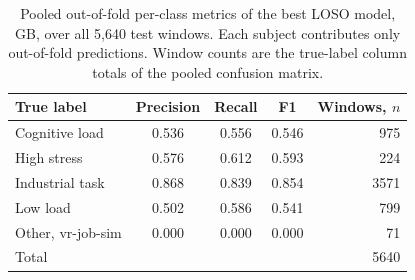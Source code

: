 \begin{table}[t]
\centering
\small
\caption{Pooled out-of-fold per-class metrics of the best LOSO model, GB, over all
5,640 test windows. Each subject contributes only out-of-fold predictions. Window
counts are the true-label column totals of the pooled confusion matrix.}
\label{tab:perclass}
\begin{tabular}{lcccr}
\toprule
True label & Precision & Recall & F1 & Windows, $n$ \\
\midrule
Cognitive load & 0.536 & 0.556 & 0.546 & 975 \\
High stress & 0.576 & 0.612 & 0.593 & 224 \\
Industrial task & 0.868 & 0.839 & 0.854 & 3571 \\
Low load & 0.502 & 0.586 & 0.541 & 799 \\
Other, vr-job-sim & 0.000 & 0.000 & 0.000 & 71 \\
\midrule Total & & & & 5640 \\
\bottomrule
\end{tabular}
\end{table}
